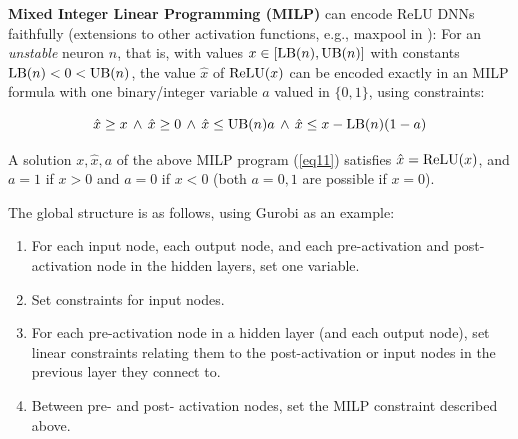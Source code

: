 	

	
	\textbf{Mixed Integer Linear Programming (MILP)} can encode ReLU DNNs
faithfully	(extensions to other activation functions, e.g., maxpool in \cite{DivideAndSlide}):
	For an {\em unstable} neuron $n$, that is, with values 
    $x \in [\mathrm{LB}(n),\mathrm{UB}(n)]$ with constants $\mathrm{LB}(n)<0<\mathrm{UB}(n)$, the value $\hat{x}$ of $\mathrm{ReLU}(x)$ can be encoded exactly in an MILP formula \cite{MILP} with one binary/integer variable $a$ valued in $\{0,1\}$, using constraints:
	
	\vspace{-0.4cm}
	\begin{equation} 
        \hat{x} \geq x \, \wedge \, \hat{x} \geq 0 \, \wedge \, \hat{x} \leq \mathrm{UB}(n) a \, \wedge \, \hat{x} \leq x-\mathrm{LB}(n) (1-a)
		\label{eq11}
	\end{equation}
	
\begin{proposition}
\cite{MILP}
\label{Prop1}
A solution $x,\hat{x},a$  of the above MILP program (\ref{eq11}) satisfies $\hat{x} = \mathrm{ReLU}(x)$,
and $a=1$ if $x> 0$ and $a=0$ if $x< 0$ (both $a=0,1$ are possible if $x=0$).
\end{proposition}

	
    \iffalse
	The global structure is as follows, using Gurobi as an example:
	\begin{enumerate}
		\item For each input node, each output node, and each pre-activation and post-activation node in the hidden layers,  set one variable. 
		\item Set constraints for input nodes.
		\item For each pre-activation node in a hidden layer (and each output node), set linear constraints relating them to the post-activation or input nodes in the previous layer they connect to.
		\item Between pre- and post- activation nodes, set the MILP constraint described above.
	\end{enumerate} 
    
